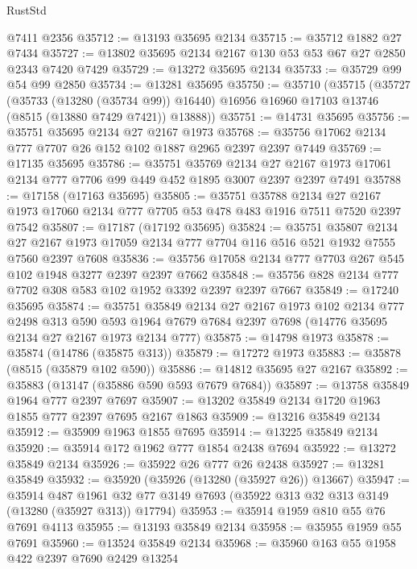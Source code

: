 \begin{lexlean}{RustStd}
\begin{coremodule}
    @7411
    @2356
@35712 := @13193 @35695 @2134
@35715 := @35712 @1882 @27 @7434
@35727 := @13802 @35695 @2134 @2167 @130 @53 @53 @67 @27 @2850 @2343 @7420 @7429
@35729 := @13272 @35695 @2134
@35733 := @35729 @99 @54 @99 @2850
@35734 := @13281 @35695
@35750 := @35710
    (@35715
      (@35727
        (@35733 (@13280 (@35734 @99)) @16440)
        @16956
        @16960
        @17103
        @13746
        (@8515 (@13880 @7429 @7421))
        @13888))
@35751 := @14731 @35695
@35756 := @35751 @35695 @2134 @27 @2167 @1973
@35768 := @35756 @17062 @2134 @777 @7707 @26 @152 @102 @1887 @2965 @2397 @2397 @7449
@35769 := @17135 @35695
@35786 := @35751
    @35769
    @2134
    @27
    @2167
    @1973
    @17061
    @2134
    @777
    @7706
    @99
    @449
    @452
    @1895
    @3007
    @2397
    @2397
    @7491
@35788 := @17158 (@17163 @35695)
@35805 := @35751
    @35788
    @2134
    @27
    @2167
    @1973
    @17060
    @2134
    @777
    @7705
    @53
    @478
    @483
    @1916
    @7511
    @7520
    @2397
    @7542
@35807 := @17187 (@17192 @35695)
@35824 := @35751
    @35807
    @2134
    @27
    @2167
    @1973
    @17059
    @2134
    @777
    @7704
    @116
    @516
    @521
    @1932
    @7555
    @7560
    @2397
    @7608
@35836 := @35756 @17058 @2134 @777 @7703 @267 @545 @102 @1948 @3277 @2397 @2397 @7662
@35848 := @35756 @828 @2134 @777 @7702 @308 @583 @102 @1952 @3392 @2397 @2397 @7667
@35849 := @17240 @35695
@35874 := @35751
    @35849
    @2134
    @27
    @2167
    @1973
    @102
    @2134
    @777
    @2498
    @313
    @590
    @593
    @1964
    @7679
    @7684
    @2397
    @7698
    (@14776 @35695 @2134 @27 @2167 @1973 @2134 @777)
@35875 := @14798 @1973
@35878 := @35874 (@14786 (@35875 @313))
@35879 := @17272 @1973
@35883 := @35878 (@8515 (@35879 @102 @590))
@35886 := @14812 @35695 @27 @2167
@35892 := @35883 (@13147 (@35886 @590 @593 @7679 @7684))
@35897 := @13758 @35849 @1964 @777 @2397 @7697
@35907 := @13202 @35849 @2134 @1720 @1963 @1855 @777 @2397 @7695 @2167 @1863
@35909 := @13216 @35849 @2134
@35912 := @35909 @1963 @1855 @7695
@35914 := @13225 @35849 @2134
@35920 := @35914 @172 @1962 @777 @1854 @2438 @7694
@35922 := @13272 @35849 @2134
@35926 := @35922 @26 @777 @26 @2438
@35927 := @13281 @35849
@35932 := @35920 (@35926 (@13280 (@35927 @26)) @13667)
@35947 := @35914
    @487
    @1961
    @32
    @77
    @3149
    @7693
    (@35922 @313 @32 @313 @3149 (@13280 (@35927 @313)) @17794)
@35953 := @35914 @1959 @810 @55 @76 @7691 @4113
@35955 := @13193 @35849 @2134
@35958 := @35955 @1959 @55 @7691
@35960 := @13524 @35849 @2134
@35968 := @35960 @163 @55 @1958 @422 @2397 @7690 @2429 @13254

\end{coremodule}
\end{lexlean}
